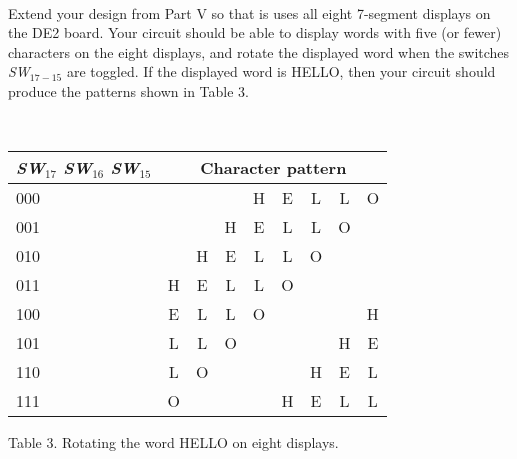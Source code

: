 \documentclass[psfig,10pt,fullpage]{article}
\begin{document}
~\\
\noindent
Extend your design from Part V so that is uses all eight 7-segment displays on the DE2
board. Your circuit should be able to display words with five (or fewer) characters 
on the eight displays, and rotate the displayed word when the switches {\it SW}$_{17-15}$ 
are toggled. If the displayed word is HELLO, then your circuit should produce the patterns 
shown in Table 3.

~\\
\begin{center}
\begin{tabular}{l|cccccccc}
{\it SW}$_{17}$ {\it SW}$_{16}$ {\it SW}$_{15}$ & \multicolumn{8}{c}{Character pattern} \\
\hline
\hspace{8.0 mm} {\rule[0mm]{0mm}{5mm}000} &  &  &  & H & E & L & L & O\\ 
\hspace{8.0 mm} 001 &  &  & H & E & L & L & O & \\
\hspace{8.0 mm} 010 &  & H & E & L & L & O &  & \\
\hspace{8.0 mm} 011 & H & E & L & L & O &  &  & \\
\hspace{8.0 mm} 100 & E & L & L & O &  &  &  & H\\
\hspace{8.0 mm} 101 & L & L & O &  &  &  & H & E\\
\hspace{8.0 mm} 110 & L & O &  &  &  & H & E & L\\
\hspace{8.0 mm} 111 & O &  &  &  & H & E & L & L\\
\end{tabular}
\end{center}

\begin{center}
Table 3. Rotating the word HELLO on eight displays.
\end{center}
~\\
~\\
\end{document}
